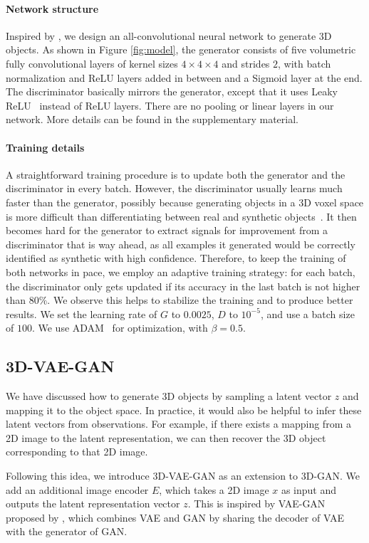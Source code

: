 \documentclass{article}
\newcommand{\model}{3D-GAN\xspace}
\newcommand{\vaemodel}{3D-VAE-GAN\xspace}
\newcommand{\myparagraph}[1]{\vspace{-10pt}\paragraph{#1}}
\newcommand{\presubsection}{\vspace{-8pt}}
\newcommand{\postsubsection}{\vspace{-6pt}}
\begin{document}
\myparagraph{Network structure} Inspired by \cite{radford2016unsupervised}, we design an all-convolutional neural network to generate 3D objects. As shown in Figure \ref{fig:model}, the generator consists of five volumetric fully convolutional layers of kernel sizes $4\times4\times4$ and strides $2$, with batch normalization and ReLU layers added in between and a Sigmoid layer at the end. The discriminator basically mirrors the generator, except that it uses Leaky ReLU~\citep{maas2013rectifier} instead of ReLU layers. 
There are no pooling or linear layers in our network. More details can be found in the supplementary material.

\myparagraph{Training details} A straightforward training procedure is to update both the generator and the discriminator in every batch. 
However, the discriminator usually learns much faster than the generator, possibly because generating objects in a 3D voxel space is more difficult than differentiating between real and synthetic objects~\citep{goodfellow2014generative,radford2016unsupervised}.  It then becomes hard for the generator to extract signals for improvement from a discriminator that is way ahead, as all examples it generated would be correctly identified as synthetic with high confidence.
Therefore, to keep the training of both networks in pace, we employ an adaptive training strategy: for each batch, the discriminator only gets updated if its accuracy in the last batch is not higher than $80\%$. We observe this helps to stabilize the training and to produce better results. We set the learning rate of $G$ to $0.0025$, $D$ to $10^{-5}$, and use a batch size of $100$. We use ADAM~\citep{kingma2014adam} for optimization, with $\beta=0.5$.

\presubsection
\subsection{\vaemodel}
\label{sec:vaegan}
\postsubsection


We have discussed how to generate 3D objects by sampling a latent vector $z$ and mapping it to the object space. In practice, it would also be helpful to infer these latent vectors from observations. For example, if there exists a mapping from a 2D image to the latent representation, we can then recover the 3D object corresponding to that 2D image.

Following this idea, we introduce \vaemodel as an extension to \model.
We add an additional image encoder $E$, which takes a 2D image $x$ as input and outputs the latent representation vector $z$. This is inspired by VAE-GAN proposed by \citep{larsen2015autoencoding}, which combines VAE and GAN by sharing the decoder of VAE with the generator of GAN. 
\end{document}
